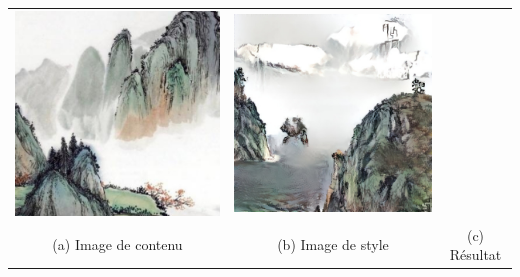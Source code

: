 \documentclass[a4paper, 12pt]{report}
\begin{document}
\begin{center}
\begin{tabular}{ccc}
    \includegraphics[height=0.15\textheight]{images/transfert-ds.jpg}&
    \includegraphics[height=0.15\textheight]{images/gaugan-tds.jpg}\\
    (a) Image de contenu & (b) Image de style &(c) Résultat
  \end{tabular}
\end{center}
\end{document}
